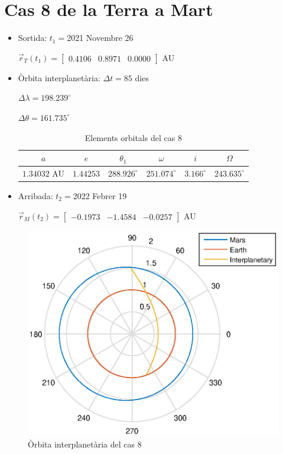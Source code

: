 \section{Cas 8 de la Terra a Mart}
\begin{itemize}
	\item Sortida: $t_{1}=$2021 Novembre 26

$\vec{r}_{T}(t_{1})=\begin{bmatrix}0.4106 & 0.8971 & 0.0000\end{bmatrix}$ AU

	\item Òrbita interplanetària: $\Delta t=85$ dies

$\Delta\lambda=198.239^{\circ}$

$\Delta\theta=161.735^{\circ}$
\begin{table}[h!]
	\centering
	\begin{tabular}{ |c|c|c|c|c|c|}
		\hline
		$a$ & $e$ & $\theta_{1}$ & $\omega$ & $i$ & $\Omega$ \\ \hline
		$1.34032$ AU  & $1.44253$ & $288.926^{\circ}$ & $251.074^{\circ}$ & $3.166^{\circ}$ & $243.635^{\circ}$ \\ \hline
	\end{tabular}
	\caption{Elements orbitals del cas 8}
\end{table}

	\item Arribada: $t_{2}=$2022 Febrer 19

$\vec{r}_{M}(t_{2})=\begin{bmatrix}-0.1973 & -1.4584 & -0.0257\end{bmatrix}$ AU
\end{itemize}
\begin{figure}[H]
	\centering
	\includegraphics[scale=0.95]{./plots/cas8}
	\caption{Òrbita interplanetària del cas 8}
\end{figure}


